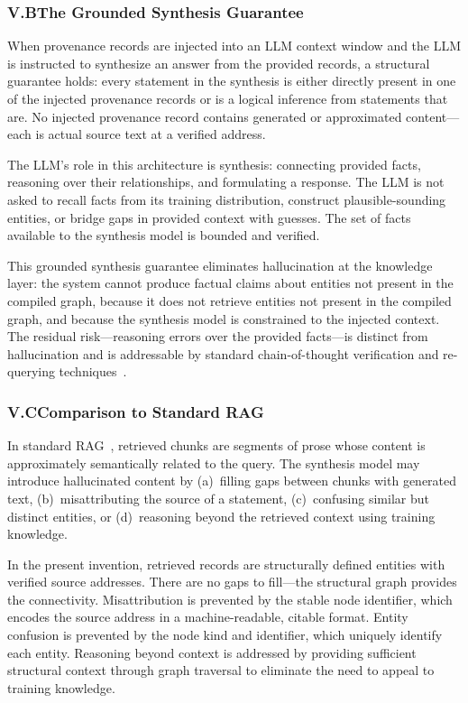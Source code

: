 \documentclass[12pt]{article}
\begin{document}
\subsubsection{V.B\quad The Grounded Synthesis Guarantee}

When provenance records are injected into an LLM context window and the LLM is
instructed to synthesize an answer from the provided records, a structural
guarantee holds: every statement in the synthesis is either directly present in
one of the injected provenance records or is a logical inference from statements
that are. No injected provenance record contains generated or approximated
content---each is actual source text at a verified address.

The LLM's role in this architecture is synthesis: connecting provided facts,
reasoning over their relationships, and formulating a response. The LLM is not
asked to recall facts from its training distribution, construct
plausible-sounding entities, or bridge gaps in provided context with guesses.
The set of facts available to the synthesis model is bounded and verified.

This grounded synthesis guarantee eliminates hallucination at the knowledge
layer: the system cannot produce factual claims about entities not present in the
compiled graph, because it does not retrieve entities not present in the compiled
graph, and because the synthesis model is constrained to the injected context.
The residual risk---reasoning errors over the provided facts---is distinct from
hallucination and is addressable by standard chain-of-thought verification and
re-querying techniques~\cite{wei2022chainofthought, yao2023react}.

\subsubsection{V.C\quad Comparison to Standard RAG}

In standard RAG~\cite{lewis2020rag}, retrieved chunks are segments of prose whose
content is approximately semantically related to the query. The synthesis model
may introduce hallucinated content by (a)~filling gaps between chunks with
generated text, (b)~misattributing the source of a statement, (c)~confusing
similar but distinct entities, or (d)~reasoning beyond the retrieved context
using training knowledge.

In the present invention, retrieved records are structurally defined entities
with verified source addresses. There are no gaps to fill---the structural graph
provides the connectivity. Misattribution is prevented by the stable node
identifier, which encodes the source address in a machine-readable, citable
format. Entity confusion is prevented by the node kind and identifier, which
uniquely identify each entity. Reasoning beyond context is addressed by providing
sufficient structural context through graph traversal to eliminate the need to
appeal to training knowledge.
\end{document}
